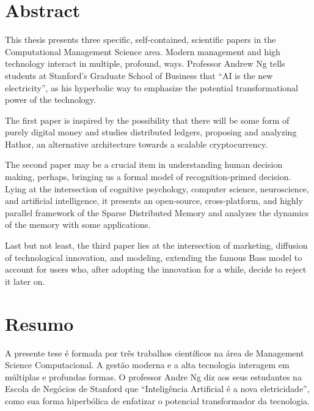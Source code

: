 \begingroup
\let\clearpage\relax
\let\cleardoublepage\relax
\let\cleardoublepage\relax

\chapter*{Abstract}

This thesis presents three specific, self-contained, scientific papers in the Computational Management Science area.
Modern management and high technology interact in multiple, profound, ways. Professor Andrew Ng tells students at Stanford’s Graduate School of Business that ``AI is the new electricity'', as his hyperbolic way to emphasize the potential transformational power of the technology.

The first paper is inspired by the possibility that there will be some form of purely digital money and studies distributed ledgers, proposing and analyzing Hathor, an alternative architecture towards a scalable cryptocurrency.

The second paper may be a crucial item in understanding human decision making, perhaps, bringing us a formal model of recognition-primed decision. Lying at the intersection of cognitive psychology, computer science, neuroscience, and artificial intelligence, it presents an open-source, cross-platform, and highly parallel framework of the Sparse Distributed Memory and analyzes the dynamics of the memory with some applications.

Last but not least, the third paper lies at the intersection of marketing, diffusion of technological innovation, and modeling, extending the famous Bass model to account for users who, after adopting the innovation for a while, decide to reject it later on.


\chapter*{Resumo}
A presente tese é formada por três trabalhos científicos na área de Management Science Computacional. A gestão moderna e a alta tecnologia interagem em múltiplas e profundas formas. O professor Andre Ng diz aos seus estudantes na Escola de Negócios de Stanford que ``Inteligência Artificial é a nova eletricidade'', como sua forma hiperbólica de enfatizar o potencial transformador da tecnologia.

